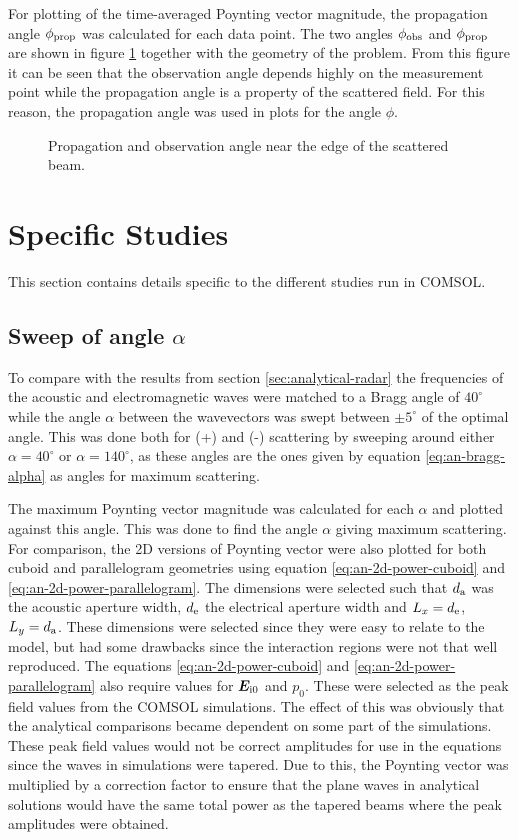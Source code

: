 \documentclass[11pt,twoside]{eitExjobb}
\begin{document}
	For plotting of the time-averaged Poynting vector magnitude, the propagation angle $\phi_{\mathrm{prop}}$ was calculated for each data point. The two angles $\phi_{\mathrm{obs}}$ and $\phi_{\mathrm{prop}}$ are shown in figure \ref{fig:sim-postproc-angles} together with the geometry of the problem. From this figure it can be seen that the observation angle depends highly on the measurement point while the propagation angle is a property of the scattered field. For this reason, the propagation angle was used in plots for the angle $\phi$.
	
	\begin{figure}[h]
		\centering
		
		\caption{\label{fig:sim-postproc-angles} Propagation and observation angle near the edge of the scattered beam.}
	\end{figure}
	
	\section{Specific Studies}
	This section contains details specific to the different studies run in COMSOL.
		
	\subsection{Sweep of angle $\alpha$}
	To compare with the results from section \ref{sec:analytical-radar} the frequencies of the acoustic and electromagnetic waves were matched to a Bragg angle of $40^\circ$ while the angle $\alpha$ between the wavevectors was swept between $\pm 5^\circ$ of the optimal angle. This was done both for (+) and (-) scattering by sweeping around either $\alpha = 40^\circ$ or $\alpha = 140^\circ$, as these angles are the ones given by equation \eqref{eq:an-bragg-alpha} as angles for maximum scattering.
	
	The maximum Poynting vector magnitude was calculated for each $\alpha$ and plotted against this angle. This was done to find the angle $\alpha$ giving maximum scattering. For comparison, the 2D versions of Poynting vector were also plotted for both cuboid and parallelogram geometries using equation \eqref{eq:an-2d-power-cuboid} and \eqref{eq:an-2d-power-parallelogram}. The dimensions were selected such that $d_{\mathrm{a}}$ was the acoustic aperture width, $d_{\mathrm{e}}$ the electrical aperture width and $L_x = d_{\mathrm{e}}$, $L_y = d_{\mathrm{a}}$. These dimensions were selected since they were easy to relate to the model, but had some drawbacks since the interaction regions were not that well reproduced. The equations \eqref{eq:an-2d-power-cuboid} and \eqref{eq:an-2d-power-parallelogram} also require values for $\bm{E}_{\mathrm{i0}}$ and $p_0$. These were selected as the peak field values from the COMSOL simulations. The effect of this was obviously that the analytical comparisons became dependent on some part of the simulations. These peak field values would not be correct amplitudes for use in the equations since the waves in simulations were tapered. Due to this, the Poynting vector was multiplied by a correction factor to ensure that the plane waves in analytical solutions would have the same total power as the tapered beams where the peak amplitudes were obtained.
	
\end{document}
